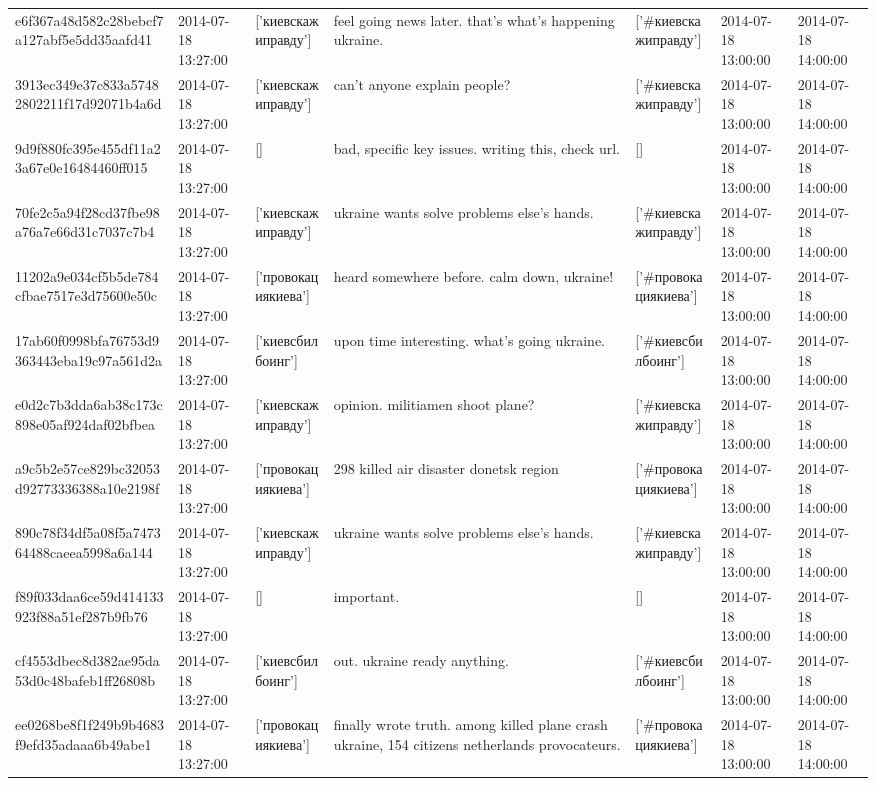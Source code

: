 \begin{tabular}{lllllll}
e6f367a48d582c28bebcf7a127abf5e5dd35aafd41 & 2014-07-18 13:27:00 & ['киевскажиправду'] & feel going news later. that's what's happening ukraine. & ['#киевскажиправду'] & 2014-07-18 13:00:00 & 2014-07-18 14:00:00 \\
3913ec349e37c833a57482802211f17d92071b4a6d & 2014-07-18 13:27:00 & ['киевскажиправду'] & can't anyone explain people? & ['#киевскажиправду'] & 2014-07-18 13:00:00 & 2014-07-18 14:00:00 \\
9d9f880fc395e455df11a23a67e0e16484460ff015 & 2014-07-18 13:27:00 & [] & bad, specific key issues. writing this, check url. & [] & 2014-07-18 13:00:00 & 2014-07-18 14:00:00 \\
70fe2c5a94f28cd37fbe98a76a7e66d31c7037c7b4 & 2014-07-18 13:27:00 & ['киевскажиправду'] & ukraine wants solve problems else's hands. & ['#киевскажиправду'] & 2014-07-18 13:00:00 & 2014-07-18 14:00:00 \\
11202a9e034cf5b5de784cfbae7517e3d75600e50c & 2014-07-18 13:27:00 & ['провокациякиева'] & heard somewhere before. calm down, ukraine! & ['#провокациякиева'] & 2014-07-18 13:00:00 & 2014-07-18 14:00:00 \\
17ab60f0998bfa76753d9363443eba19c97a561d2a & 2014-07-18 13:27:00 & ['киевсбилбоинг'] & upon time interesting. what's going ukraine. & ['#киевсбилбоинг'] & 2014-07-18 13:00:00 & 2014-07-18 14:00:00 \\
e0d2c7b3dda6ab38c173c898e05af924daf02bfbea & 2014-07-18 13:27:00 & ['киевскажиправду'] & opinion. militiamen shoot plane? & ['#киевскажиправду'] & 2014-07-18 13:00:00 & 2014-07-18 14:00:00 \\
a9c5b2e57ce829bc32053d92773336388a10e2198f & 2014-07-18 13:27:00 & ['провокациякиева'] & 298 killed air disaster donetsk region & ['#провокациякиева'] & 2014-07-18 13:00:00 & 2014-07-18 14:00:00 \\
890c78f34df5a08f5a747364488caeea5998a6a144 & 2014-07-18 13:27:00 & ['киевскажиправду'] & ukraine wants solve problems else's hands. & ['#киевскажиправду'] & 2014-07-18 13:00:00 & 2014-07-18 14:00:00 \\
f89f033daa6ce59d414133923f88a51ef287b9fb76 & 2014-07-18 13:27:00 & [] & important. & [] & 2014-07-18 13:00:00 & 2014-07-18 14:00:00 \\
cf4553dbec8d382ae95da53d0c48bafeb1ff26808b & 2014-07-18 13:27:00 & ['киевсбилбоинг'] & out. ukraine ready anything. & ['#киевсбилбоинг'] & 2014-07-18 13:00:00 & 2014-07-18 14:00:00 \\
ee0268be8f1f249b9b4683f9efd35adaaa6b49abe1 & 2014-07-18 13:27:00 & ['провокациякиева'] & finally wrote truth. among killed plane crash ukraine, 154 citizens netherlands provocateurs. & ['#провокациякиева'] & 2014-07-18 13:00:00 & 2014-07-18 14:00:00 \\

\end{tabular}
